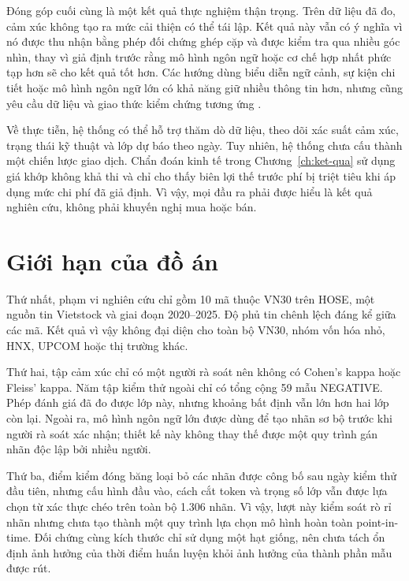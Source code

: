 \documentclass[12pt, a4paper, oneside]{report}
\begin{document}
Đóng góp cuối cùng là một kết quả thực nghiệm thận trọng. Trên dữ liệu đã đo, cảm xúc
không tạo ra mức cải thiện có thể tái lập. Kết quả này vẫn có ý nghĩa vì nó được thu
nhận bằng phép đối chứng ghép cặp và được kiểm tra qua nhiều góc nhìn, thay vì giả định
trước rằng mô hình ngôn ngữ hoặc cơ chế hợp nhất phức tạp hơn sẽ cho kết quả tốt hơn.
Các hướng dùng biểu diễn ngữ cảnh, sự kiện chi tiết hoặc mô hình ngôn ngữ lớn có khả
năng giữ nhiều thông tin hơn, nhưng cũng yêu cầu dữ liệu và giao thức kiểm chứng tương
ứng \cite{Chen2021_210708721v1,Elahi2024_241101368v1,Liang2024_241210823v2}.

Về thực tiễn, hệ thống có thể hỗ trợ thăm dò dữ liệu, theo dõi xác suất cảm xúc, trạng
thái kỹ thuật và lớp dự báo theo ngày. Tuy nhiên, hệ thống chưa cấu thành một chiến
lược giao dịch. Chẩn đoán kinh tế trong Chương~\ref{ch:ket-qua} sử dụng giá khớp không
khả thi và chỉ cho thấy biên lợi thế trước phí bị triệt tiêu khi áp dụng mức chi phí đã
giả định. Vì vậy, mọi đầu ra phải được hiểu là kết quả nghiên cứu, không phải khuyến
nghị mua hoặc bán.

\section{Giới hạn của đồ án}

Thứ nhất, phạm vi nghiên cứu chỉ gồm 10 mã thuộc VN30 trên HOSE, một nguồn tin Vietstock
và giai đoạn 2020--2025. Độ phủ tin chênh lệch đáng kể giữa các mã. Kết quả vì vậy
không đại diện cho toàn bộ VN30, nhóm vốn hóa nhỏ, HNX, UPCOM hoặc thị trường khác.

Thứ hai, tập cảm xúc chỉ có một người rà soát nên không có Cohen's kappa hoặc Fleiss'
kappa. Năm tập kiểm thử ngoài chỉ có tổng cộng 59 mẫu NEGATIVE. Phép đánh giá đã đo
được lớp này, nhưng khoảng bất định vẫn lớn hơn hai lớp còn lại. Ngoài ra, mô hình ngôn
ngữ lớn được dùng để tạo nhãn sơ bộ trước khi người rà soát xác nhận; thiết kế này không
thay thế được một quy trình gán nhãn độc lập bởi nhiều người.

Thứ ba, điểm kiểm đóng băng loại bỏ các nhãn được công bố sau ngày kiểm thử đầu tiên,
nhưng cấu hình đầu vào, cách cắt token và trọng số lớp vẫn được lựa chọn từ xác thực
chéo trên toàn bộ 1.306 nhãn. Vì vậy, lượt này kiểm soát rò rỉ nhãn nhưng chưa tạo
thành một quy trình lựa chọn mô hình hoàn toàn point-in-time. Đối chứng cùng kích thước
chỉ sử dụng một hạt giống, nên chưa tách ổn định ảnh hưởng của thời điểm huấn luyện khỏi
ảnh hưởng của thành phần mẫu được rút.
\end{document}
